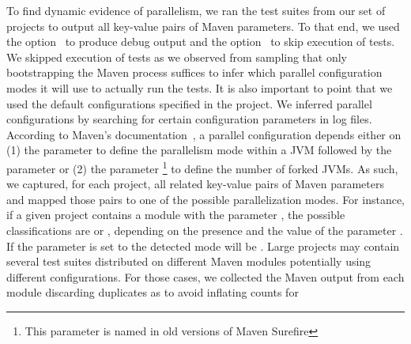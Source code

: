 To find dynamic evidence of parallelism, we ran the test suites from
our set of \numMedLong{} projects to output all key-value pairs of
Maven parameters.  To that end, we used the option~ to
produce debug output and the option~ to skip
execution of tests.  We skipped execution of tests as we observed from
sampling that only bootstrapping the Maven process suffices to infer
which parallel configuration modes it will use to actually run the
tests.  It is also important to point that we used the default
configurations specified in the project.  We inferred parallel
configurations by searching for certain configuration parameters in
log files. According to Maven's
documentation~\cite{maven-surefire-plugin}, a parallel configuration
depends either on (1) the parameter  to define the
parallelism mode within a JVM followed by the parameter
 or (2) the parameter
\footnote{This parameter is named 
  in old versions of Maven Surefire} to define the number of forked
JVMs.  As such, we captured, for each project, all related key-value
pairs of Maven parameters and mapped those pairs to one of the
possible parallelization modes.  For instance, if a given project
contains a module with the parameter
, the possible classifications are
\ForkSeq{} or \ForkParMeth{}, depending on the presence and the value
of the parameter .  If the parameter
 is set to  the detected mode will be
\ForkParMeth{}.  Large projects may contain several test suites
distributed on different Maven modules potentially using different
configurations.  For those cases, we collected the Maven output from
each module discarding duplicates as to avoid inflating counts for
